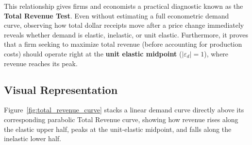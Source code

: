 \documentclass[11pt,letterpaper]{article}
\begin{document}
This relationship gives firms and economists a practical diagnostic known as the \textbf{Total Revenue Test}. Even without estimating a full econometric demand curve, observing how total dollar receipts move after a price change immediately reveals whether demand is elastic, inelastic, or unit elastic. Furthermore, it proves that a firm seeking to maximize total revenue (before accounting for production costs) should operate right at the \textbf{unit elastic midpoint} ($|\varepsilon_d| = 1$), where revenue reaches its peak.

\subsection*{Visual Representation}
Figure~\ref{fig:total_revenue_curve} stacks a linear demand curve directly above its corresponding parabolic Total Revenue curve, showing how revenue rises along the elastic upper half, peaks at the unit-elastic midpoint, and falls along the inelastic lower half.
\end{document}
